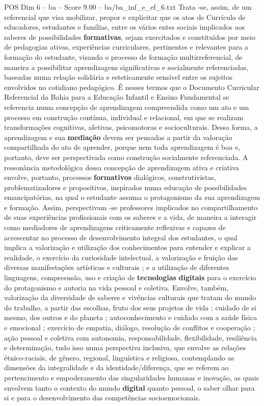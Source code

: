 \begin{textsample}{POS Dim 6 – ba – Score 9.00 – ba/ba\_inf\_e\_ef\_6.txt}
Trata -se, assim, de um referencial que visa mobilizar, propor e explicitar que os atos de Currículo de educadores, estudantes e famílias, entre os vários entes sociais implicados aos saberes de possibilidades \textbf{formativas}, sejam exercitados e constituídos por meio de pedagogias ativas, experiências curriculares, pertinentes e relevantes para a formação do estudante, visando o processo de formação multirreferencial, de maneira a possibilitar aprendizagens significativas e socialmente referenciadas, baseadas numa relação solidária e esteticamente sensível entre os sujeitos envolvidos no cotidiano pedagógico.
É nesses termos que o Documento Curricular Referencial da Bahia para a Educação Infantil e Ensino Fundamental se referencia numa concepção de aprendizagem compreendida como um ato e um processo em construção contínua, individual e relacional, em que se realizam transformações cognitivas, afetivas, psicomotoras e socioculturais.
Dessa forma, a aprendizagem e sua \textbf{mediação} devem ser pensadas a partir da valoração compartilhada do ato de aprender, porque nem toda aprendizagem é boa e, portanto, deve ser perspectivada como construção socialmente referenciada.
A ressonância metodológica dessa concepção de aprendizagem ativa e criativa envolve, portanto, processos \textbf{formativos} dialógicos, construtivistas, problematizadores e propositivos, inspirados numa educação de possibilidades emancipatórias, na qual o estudante assuma o protagonismo da sua aprendizagem e formação.
Assim, perspectivam -se professores implicados no compartilhamento de suas experiências profissionais com os saberes e a vida, de maneira a interagir como mediadores de aprendizagens criticamente reflexivas e capazes de acrescentar no processo de desenvolvimento integral dos estudantes, o qual implica a valorização e utilização dos conhecimentos para entender e explicar a realidade, o exercício da curiosidade intelectual, a valorização e fruição das diversas manifestações artísticas e culturais ; e a utilização de diferentes linguagens, compreensão, uso e criação de \textbf{tecnologias} \textbf{digitais} para o exercício do protagonismo e autoria na vida pessoal e coletiva.
Envolve, também, valorização da diversidade de saberes e vivências culturais que tratam do mundo do trabalho, a partir das escolhas, fruto dos seus projetos de vida ; cuidado de si mesmo, dos outros e do planeta ; autoconhecimento e cuidado com a saúde física e emocional ; exercício de empatia, diálogo, resolução de conflitos e cooperação ; ação pessoal e coletiva com autonomia, responsabilidade, flexibilidade, resiliência e determinação, tudo isso numa perspectiva inclusiva, que envolve as relações étnico-raciais, de gênero, regional, linguística e religiosa, contemplando as dimensões da integralidade e da identidade/diferença, que se referem ao pertencimento e empoderamento das singularidades humanas e inovação, as quais envolvem tanto o contexto do mundo \textbf{digital} quanto pessoal, o saber olhar para si e para o desenvolvimento das competências socioemocionais.

\end{textsample}
